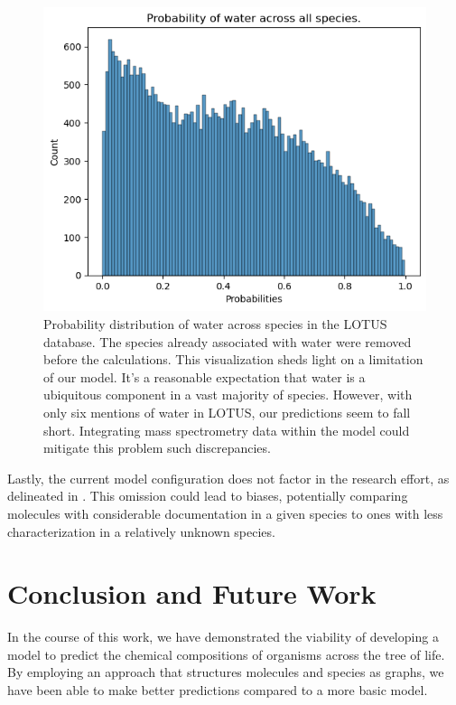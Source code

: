\documentclass[
11pt, %
oneside, %
english, %
singlespacing, %
headsepline, %
chapterinoneline, %
]{MastersDoctoralThesis} %
\begin{document}
\begin{figure}[h]
	\centering
	\includegraphics[scale=0.7]{figure/water}
	\caption{Probability distribution of water across species in the LOTUS database. The species already associated with water were removed before the calculations. This visualization sheds light on a limitation of our model. It's a reasonable expectation that water is a ubiquitous component in a vast majority of species. However, with only six mentions of water in LOTUS, our predictions seem to fall short. Integrating mass spectrometry data within the model could mitigate this problem such discrepancies.}
	\label{fig: water probabilities}
\end{figure}

Lastly, the current model configuration does not factor in the research effort, as delineated in . This omission could lead to biases, potentially comparing molecules with considerable documentation in a given species to ones with less characterization in a relatively unknown species.


\chapter{Conclusion and Future Work}
In the course of this work, we have demonstrated the viability of developing a model to predict the chemical compositions of organisms across the tree of life. By employing an approach that structures molecules and species as graphs, we have been able to make better predictions compared to a more basic model.
\end{document}
